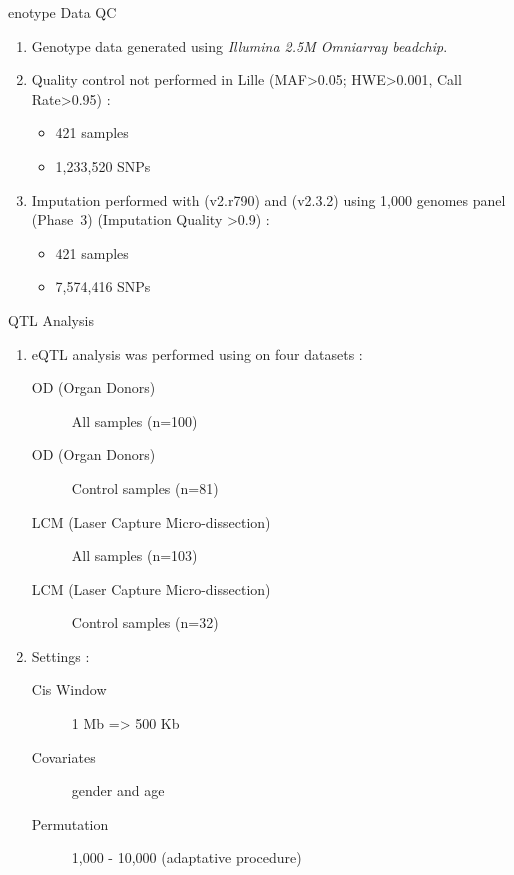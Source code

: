 \begin{frame}{enotype Data QC}
\begin{enumerate}
    \item Genotype data generated using \textit{Illumina 2.5M Omniarray beadchip}.
    \item Quality control not performed in Lille (MAF>0.05; HWE>0.001, Call Rate>0.95) :
        \begin{itemize}
            \item 421 samples
            \item 1,233,520 SNPs
        \end{itemize}
    \item Imputation performed with  (v2.r790)\citep{delaneau2012linear} and  (v2.3.2)\citep{howie2009flexible} using 1,000 genomes panel (Phase~3)\citep{the_1000_genomes_project_consortium_global_2015} (Imputation Quality >0.9) :
        \begin{itemize}
            \item 421 samples
            \item 7,574,416 SNPs
        \end{itemize}
\end{enumerate}
\end{frame}

\begin{frame}{QTL Analysis}
\begin{enumerate}
    \item eQTL analysis was performed using  \citep{ongen2015fast} on four datasets :
        \begin{description}
            \item[OD (Organ Donors)] All samples (n=100)
            \item[OD (Organ Donors)] Control samples (n=81)
            \item[LCM (Laser Capture Micro-dissection)] All samples (n=103)
            \item[LCM (Laser Capture Micro-dissection)] Control samples (n=32)
        \end{description}
    \item Settings :
        \begin{description}
            \item[Cis Window] 1 Mb => 500 Kb
            \item[Covariates] gender and age
            \item[Permutation] 1,000 - 10,000 (adaptative procedure)
        \end{description}
\end{enumerate}
\end{frame}

